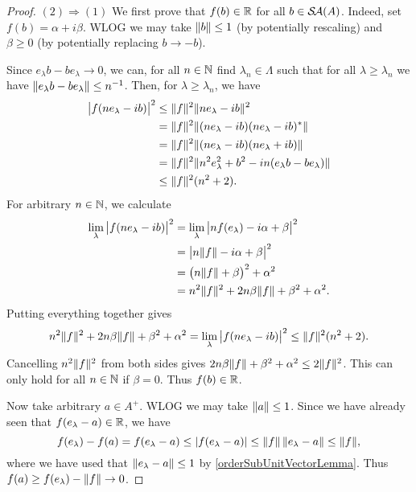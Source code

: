 \begin{proof}
$(2) \Rightarrow (1)$ We first prove that $f(b)\in \mathbb{R}$ for all $b\in \mathop{\mathcal{S}\hspace{-0.15em}\mathcal{A}}\nolimits(A)$. Indeed, set $f(b) = \alpha + i\beta$. WLOG we may take $\lVert b\rVert \leq 1$ (by potentially rescaling) and $\beta \geq 0$ (by potentially replacing $b\to -b$).

Since $e_\lambda b - be_\lambda \to 0$, we can, for all $n\in \mathbb{N}$ find $\lambda_n\in \Lambda$ such that for all $\lambda \geq \lambda_n$ we have $\lVert e_\lambda b - be_\lambda\rVert \leq n^{-1}$. Then, for $\lambda \geq \lambda_n$, we have
\begin{align*}
\big|f(ne_\lambda - ib)\big|^2 &\leq \lVert f\rVert^2\lVert ne_\lambda - ib\rVert^2 \\
&= \lVert f\rVert^2\lVert(ne_\lambda - ib)(ne_\lambda - ib)^*\rVert \\
&= \lVert f\rVert^2\lVert(ne_\lambda - ib)(ne_\lambda + ib)\rVert \\
&= \lVert f\rVert^2\lVert n^2e_\lambda^2 + b^2 - in(e_\lambda b - be_\lambda)\rVert \\
&\leq \lVert f\rVert^2(n^2 + 2).
\end{align*}
For arbitrary $n\in \mathbb{N}$, we calculate
\begin{align*}
\lim_\lambda \big|f(ne_\lambda - ib)\big|^2 &= \lim_\lambda \big|nf(e_\lambda) - i\alpha + \beta\big|^2 \\
&= \big|n\lVert f\rVert - i\alpha + \beta\big|^2 \\
&= \big(n\lVert f\rVert+\beta\big)^2 + \alpha^2 \\
&= n^2\lVert f\rVert^2 + 2n\beta\lVert f\rVert+\beta^2 + \alpha^2.
\end{align*}
Putting everything together gives
\[ n^2\lVert f\rVert^2 + 2n\beta\lVert f\rVert+\beta^2 + \alpha^2 = \lim_\lambda \big|f(ne_\lambda - ib)\big|^2 \leq \lVert f\rVert^2(n^2 + 2). \]
Cancelling $n^2\lVert f\rVert^2$ from both sides gives $2n\beta\lVert f\rVert+\beta^2 + \alpha^2 \leq 2\lVert f\rVert^2$. This can only hold for all $n\in \mathbb{N}$ if $\beta = 0$. Thus $f(b)\in \mathbb{R}$.

Now take arbitrary $a\in A^+$. WLOG we may take $\lVert a\rVert\leq 1$. Since we have already seen that $f(e_\lambda - a) \in \mathbb{R}$, we have
\[ f(e_\lambda) - f(a) = f(e_\lambda - a) \leq |f(e_\lambda - a)| \leq \lVert f\rVert\,\lVert e_\lambda - a\rVert \leq \lVert f\rVert, \]
where we have used that $\lVert e_\lambda - a\rVert \leq 1$ by \ref{orderSubUnitVectorLemma}.
Thus $f(a) \geq f(e_\lambda) - \lVert f\rVert \to 0$.
\end{proof}


